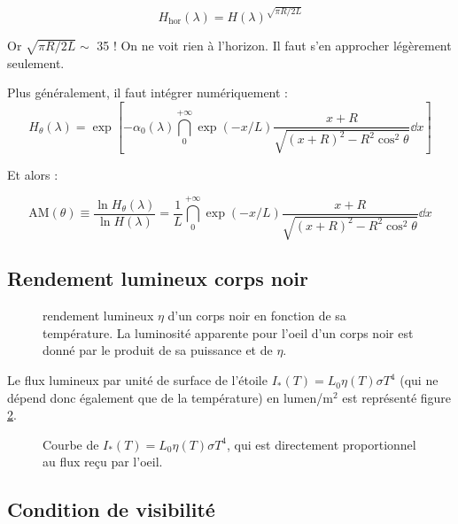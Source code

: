 \documentclass[11pt]{article} %
\begin{document}
\begin{equation}
H_{\mbox{hor}}(\lambda) = H(\lambda)^{\sqrt{\pi R/2L}}
\end{equation}

Or $\sqrt{\pi R/2L} \sim $ 35 ! On ne voit rien à l'horizon. Il faut s'en approcher légèrement seulement.

Plus généralement, il faut intégrer numériquement :
\begin{equation}
H_\theta(\lambda) = \exp \left [ -\alpha_0(\lambda) \dint_0^{+\infty}\exp(-x/L) \dfrac{x + R}{\sqrt{(x+R)^2 -  R^2\cos^2 \theta }} \dd x\right ] 
\end{equation}

Et alors :

\begin{equation}
\mbox{AM}(\theta) \equiv \dfrac{\ln H_\theta(\lambda)}{\ln H(\lambda)} = \dfrac{1}{L}\dint_0^{+\infty}\exp(-x/L) \dfrac{x + R}{\sqrt{(x+R)^2 -  R^2\cos^2 \theta }} \dd x
\end{equation}


\subsection{Rendement lumineux corps noir}

\begin{figure}[H]
\centering
  \caption{rendement lumineux $\eta$ d'un corps noir en fonction de sa température. La luminosité apparente pour l'oeil d'un corps noir est donné par le produit de sa puissance et de $\eta$. 
\label{fig:eta}}

\end{figure}

Le flux lumineux par unité de surface de l'étoile $I_*(T) = L_0 \eta(T) \sigma T^4$ (qui ne dépend donc également que de la température) en lumen/m$^2$ est représenté figure \ref{fig:eta_t4}. 

\begin{figure}[H]
\centering
  \caption{Courbe de $I_*(T) = L_0 \eta(T) \sigma T^4$, qui est directement proportionnel au flux reçu par l'oeil.
\label{fig:eta_t4}}

\end{figure}

\subsection{Condition de visibilité}
\end{document}
